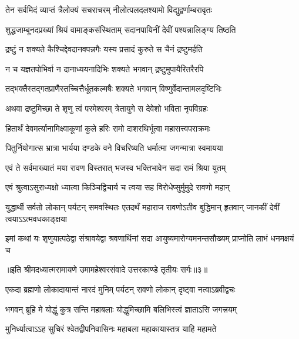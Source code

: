 \twolineshloka
{तेन सर्वमिदं व्याप्तं त्रैलोक्यं सचराचरम्}
{नीलोत्पलदलश्यामो विद्युद्वर्णाम्बरावृतः} %

\twolineshloka
{शुद्धजाम्बूनदप्रख्यां श्रियं वामाङ्कसंस्थिताम्}
{सदानपायिनीं देवीं पश्यन्नालिङ्ग्य तिष्ठति} %

\twolineshloka
{द्रष्टुं न शक्यते कैश्चिद्देवदानवपन्नगैः}
{यस्य प्रसादं कुरुते स चैनं द्रष्टुमर्हति} %

\twolineshloka
{न च यज्ञतपोभिर्वा न दानाध्ययनादिभिः}
{शक्यते भगवान् द्रष्टुमुपायैरितरैरपि} %

\twolineshloka
{तद्भक्तैस्तद्गतप्राणैस्तच्चित्तैर्धूतकल्मषैः}
{शक्यते भगवान् विष्णुर्वेदान्तामलदृष्टिभिः} %

\twolineshloka
{अथवा द्रष्टुमिच्छा ते शृणु त्वं परमेश्वरम्}
{त्रेतायुगे स देवेशो भविता नृपविग्रहः} %

\twolineshloka
{हितार्थं देवमर्त्यानामिक्ष्वाकूणां कुले हरिः}
{रामो दाशरथिर्भूत्वा महासत्त्वपराक्रमः} %

\twolineshloka
{पितुर्नियोगात्स भ्रात्रा भार्यया दण्डके वने}
{विचरिष्यति धर्मात्मा जगन्मात्रा स्वमायया} %

\twolineshloka
{एवं ते सर्वमाख्यातं मया रावण विस्तरात्}
{भजस्व भक्तिभावेन सदा रामं श्रिया युतम्} %


\twolineshloka
{एवं श्रुत्वाऽसुराध्यक्षो ध्यात्वा किञ्चिद्विचार्य च}
{त्वया सह विरोधेप्सुर्मुमुदे रावणो महान्} %

\threelineshloka
{युद्धार्थी सर्वतो लोकान् पर्यटन् समवस्थितः}
{एतदर्थं महाराज रावणोऽतीव बुद्धिमान्}
{हृतवान् जानकीं देवीं त्वयाऽऽत्मवधकाङ्क्षया} %

\fourlineindentedshloka
{इमां कथां यः शृणुयात्पठेद्वा}
{संश्रावयेद्वा श्रवणार्थिनां सदा}
{आयुष्यमारोग्यमनन्तसौख्यम्}
{प्राप्नोति लाभं धनमक्षयं च} %

{॥इति श्रीमदध्यात्मरामायणे उमामहेश्वरसंवादे उत्तरकाण्डे
तृतीयः सर्गः॥३॥
}





\twolineshloka
{एकदा ब्रह्मणो लोकादायान्तं नारदं मुनिम्}
{पर्यटन् रावणो लोकान् दृष्ट्वा नत्वाऽब्रवीद्वचः} %

\twolineshloka
{भगवन् ब्रूहि मे योद्धुं कुत्र सन्ति महाबलाः}
{योद्धुमिच्छामि बलिभिस्त्वं ज्ञाताऽसि जगत्त्रयम्} %

\twolineshloka
{मुनिर्ध्यात्वाऽऽह सुचिरं श्वेतद्वीपनिवासिनः}
{महाबला महाकायास्तत्र याहि महामते} %

